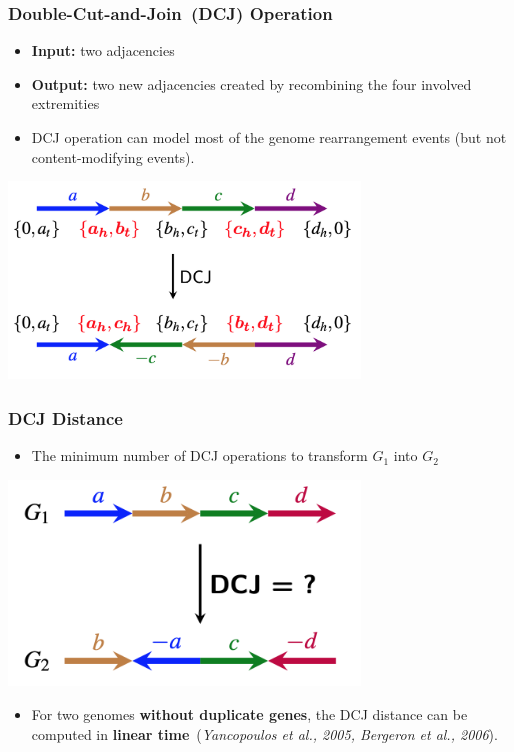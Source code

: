 \documentclass[mathserif]{beamer}
\begin{document}
\frame
{
	\frametitle{Double-Cut-and-Join~(DCJ) Operation}
	\begin{itemize}
	\item {\bf Input:} two adjacencies
	\item {\bf Output:} two new adjacencies created by recombining the four involved extremities
	\item {DCJ operation can model most of the genome rearrangement events (but not content-modifying events).}
	\end{itemize}

	\begin{center}
		\includegraphics[width=0.7\textwidth]{L8-DCJ3.png}
	\end{center}

}

\frame
{
	\frametitle{DCJ Distance}
	\vspace{-0.6cm}
	\begin{itemize}
	\item The minimum number of DCJ operations to transform $G_1$ into $G_2$
	\end{itemize}

	\begin{center}
		\includegraphics[width=0.7\textwidth]{L8-DCJ4.png}
	\end{center}

	\begin{itemize}
	\item<1-> For two genomes {\bf without duplicate genes}, the DCJ distance can 
		be computed in {\bf linear time}~({\it Yancopoulos et al., 2005, Bergeron et al., 2006}).
	\end{itemize}
}
\end{document}
